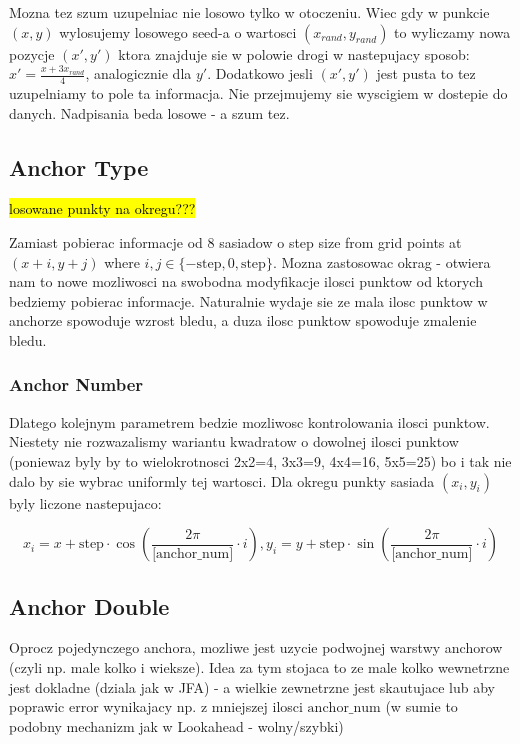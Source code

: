 \documentclass[format=acmsmall,screen,review,authordraft,nonacm]{acmart}
\begin{document}
Mozna tez szum uzupelniac nie losowo tylko w otoczeniu. Wiec gdy w punkcie
$(x,y)$ wylosujemy losowego seed-a o wartosci $(x_{rand}, y_{rand})$ to
wyliczamy nowa pozycje $(x', y')$ ktora znajduje sie
w polowie drogi w nastepujacy sposob: $x' = \frac{x+3x_{rand}}{4}$, analogicznie
dla $y'$. Dodatkowo jesli $(x', y')$ jest pusta to tez uzupelniamy to pole ta
informacja. Nie przejmujemy sie wyscigiem w dostepie do danych. Nadpisania beda
losowe - a szum tez.

\subsection{Anchor Type} %

\hl{losowane punkty na okregu???}

Zamiast pobierac informacje od 8 sasiadow o step size from grid points at
$(x+i, y+j)$ where $i, j \in \{-\text{step}, 0, \text{step}\}$. Mozna zastosowac
okrag - otwiera nam to nowe mozliwosci na swobodna modyfikacje ilosci punktow od
ktorych bedziemy pobierac informacje. Naturalnie wydaje sie ze mala ilosc
punktow w anchorze spowoduje wzrost bledu, a duza ilosc punktow spowoduje
zmalenie bledu.

\subsubsection{Anchor Number} %

Dlatego kolejnym parametrem bedzie mozliwosc kontrolowania ilosci punktow.
Niestety nie rozwazalismy wariantu kwadratow o dowolnej ilosci punktow (poniewaz
byly by to wielokrotnosci 2x2=4, 3x3=9, 4x4=16, 5x5=25) bo i tak nie dalo by sie
wybrac uniformly tej wartosci. Dla okregu punkty sasiada $(x_i, y_i)$ byly liczone
nastepujaco:
   
$$
x_i = x + \text{step} \cdot \cos( \frac{2\pi}{\text{[anchor\_num]}} \cdot i ),
y_i = y + \text{step} \cdot \sin( \frac{2\pi}{\text{[anchor\_num]}} \cdot i )
$$

\subsection{Anchor Double} %

Oprocz pojedynczego anchora, mozliwe jest uzycie podwojnej warstwy anchorow
(czyli np. male kolko i wieksze). Idea za tym stojaca to ze male kolko
wewnetrzne jest dokladne (dziala jak w JFA) - a wielkie zewnetrzne
jest skautujace lub aby poprawic error wynikajacy np. z mniejszej ilosci
$\text{anchor\_num}$ (w sumie to podobny mechanizm jak w Lookahead - wolny/szybki)
\end{document}
